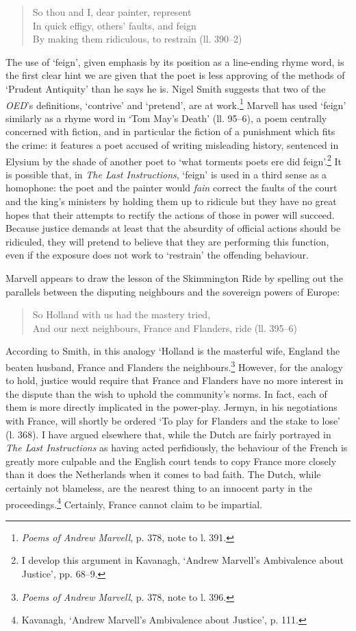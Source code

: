 ﻿\documentclass[12pt]{article}
\newcommand{\citedtitle}[1]{\textit{#1}}
\begin{document}
\begin{verse}
So thou and I, dear painter, represent\\
In quick effigy, others’ faults, and feign\\
By making them ridiculous, to restrain (ll. 390–2)
\end{verse}
The use of ‘feign’, given emphasis by its position as a line-ending rhyme word, is
the first clear hint we are given that the poet is less approving of the
methods of ‘Prudent Antiquity’ than he says he is. Nigel Smith suggests that
two of the \citedtitle{OED}’s definitions,
‘contrive’ and ‘pretend’, are at work.\footnote{\citedtitle{Poems of Andrew Marvell}, p. 378, note to l. 391.}
Marvell has used ‘feign’ similarly as a rhyme word in ‘Tom May’s Death’ (ll.
95–6), a poem centrally concerned with fiction, and in particular the fiction
of a punishment which fits the crime: it features a poet accused of writing
misleading history, sentenced in Elysium by the shade of another poet to ‘what
torments poets ere did feign’.\footnote{I develop this argument
in Kavanagh, ‘Andrew Marvell’s Ambivalence about Justice’, pp. 68–9.}
It is possible that, in \citedtitle{The Last Instructions}, ‘feign’ is used in a
third sense as a homophone: the poet and the painter would \emph{fain}
correct the faults of
the court and the king’s ministers by holding them up to ridicule but they have
no great hopes that their attempts to rectify the actions of those in power
will succeed. Because justice demands at least that the absurdity of official
actions should be ridiculed, they will pretend to believe that they are
performing this function, even if the exposure does not work to ‘restrain’ the
offending behaviour.

Marvell
appears to draw the lesson of the Skimmington Ride by spelling out the
parallels between the disputing neighbours and the sovereign powers of Europe:

\begin{verse}
So Holland with us had the mastery tried,\\
And our next neighbours, France and Flanders, ride (ll. 395–6)
\end{verse}
According to Smith, in this analogy ‘Holland is the masterful wife, England the beaten
husband, France and Flanders the neighbours.\footnote{\citedtitle{Poems of Andrew Marvell}, p. 378, note to l. 396.}
However, for the analogy to hold, justice would require that France and
Flanders have no more interest in the dispute than the wish to uphold the
community’s norms. In fact, each of them is more directly implicated in the
power-play. Jermyn, in his negotiations with France, will shortly be ordered
‘To play for Flanders and the stake to lose’ (l. 368). I have argued elsewhere
that, while the Dutch are fairly portrayed in \citedtitle{The Last Instructions} as having acted
perfidiously, the behaviour of the French is greatly more culpable and the
English court tends to copy France more closely than it does the Netherlands
when it comes to bad faith. The Dutch, while certainly not blameless, are the
nearest thing to an innocent party in the proceedings.\footnote{Kavanagh, ‘Andrew Marvell’s Ambivalence about Justice’, p. 111.}
Certainly, France cannot claim to be impartial.
\end{document}
